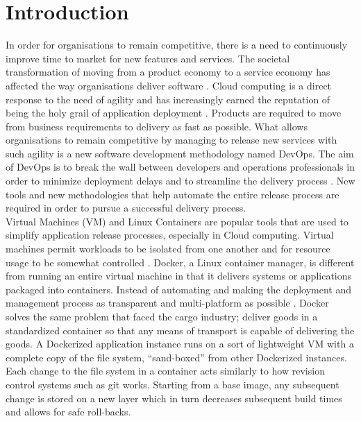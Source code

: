 \chapter{Introduction}
In order for organisations to remain competitive, there is a need to continuously improve time to market for new features and services. The societal transformation of moving from a product economy to a service economy has affected the way organisations deliver software \cite{mckinsey}. Cloud computing is a direct response to the need of agility and has increasingly earned the reputation of being the holy grail of application deployment \cite{7034713}. Products are required to move from business requirements to delivery as fast as possible. What allows organisations to remain competitive by managing to release new services with such agility is a new software development methodology named DevOps. The aim of DevOps is to break the wall between developers and operations professionals in order to minimize deployment delays and to streamline the delivery process \cite{Httermann:2012:DD:2380958}. New tools and new methodologies that help automate the entire release process are required in order to pursue a successful delivery process.\\

Virtual Machines (VM) and Linux Containers are popular tools that are used to simplify application release processes, especially in Cloud computing. Virtual machines permit workloads to be isolated from one another and for resource usage to be somewhat controlled \cite{vmvscontainers}. Docker, a Linux container manager, is different from running an entire virtual machine in that it delivers systems or applications packaged into containers. Instead of automating and making the deployment and management process as transparent and multi-platform as possible \cite{vmvscontainers}. Docker solves the same problem that faced the cargo industry; deliver goods in a standardized container so that any means of transport is capable of delivering the goods. A Dockerized application instance runs on a sort of lightweight VM with a complete copy of the file system, “sand-boxed” from other Dockerized instances. Each change to the file system in a container acts similarly to how revision control systems such as git works. Starting from a base image, any subsequent change is stored on a new layer which in turn decreases subsequent build times and allows for safe roll-backs.\\

